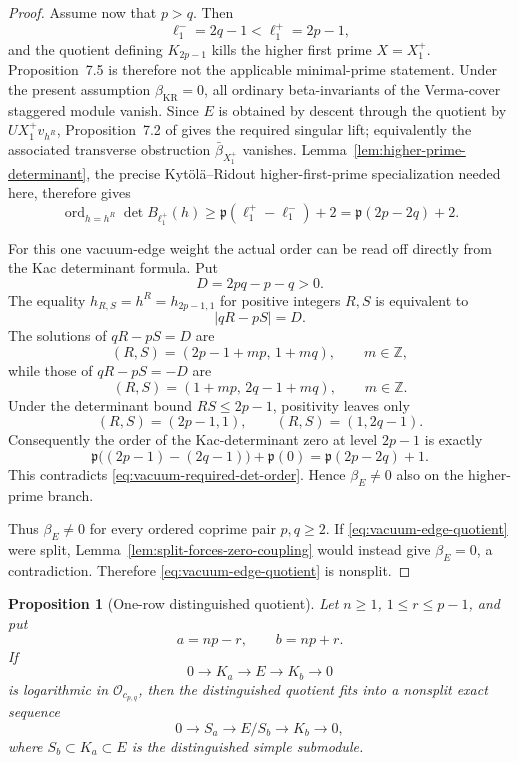 \documentclass[12pt,leqno]{amsart}
\numberwithin{equation}{section}
\newtheorem{prop}[thm]{Proposition}
\newcommand{\Oc}{\mathcal O}
\def\Z{\mathbb{Z}}
\begin{document}
\begin{proof}
Assume now that $p>q$.  Then
\[
 \ell^-_1=2q-1<\ell^+_1=2p-1,
\]
and the quotient defining $K_{2p-1}$ kills the higher first prime
$X=X^+_1$.  Proposition~7.5 is therefore not the applicable
minimal-prime statement.  Under the present assumption
$\beta_{\mathrm{KR}}=0$, all ordinary beta-invariants of the Verma-cover
staggered module vanish.  Since $E$ is obtained by descent through the
quotient by $UX^+_1v_{h^R}$, Proposition~7.2 of
\cite{KytolaRidout} gives the required singular lift; equivalently the
associated transverse obstruction $\bar\beta_{X^+_1}$ vanishes.
Lemma~\ref{lem:higher-prime-determinant}, the precise
Kyt\"ol\"a--Ridout higher-first-prime specialization needed here,
therefore gives
\begin{equation}\label{eq:vacuum-required-det-order}
 \operatorname{ord}_{h=h^R}\det B_{\ell^+_1}(h)
 \ge \mathfrak p(\ell^+_1-\ell^-_1)+2
 =\mathfrak p(2p-2q)+2.
\end{equation}

For this one vacuum-edge weight the actual order can be read off directly
from the Kac determinant formula.  Put
\[
 D=2pq-p-q>0.
\]
The equality $h_{R,S}=h^R=h_{2p-1,1}$ for positive integers $R,S$ is
equivalent to
\[
 |qR-pS|=D.
\]
The solutions of $qR-pS=D$ are
\[
 (R,S)=(2p-1+mp,\,1+mq),\qquad m\in\Z,
\]
while those of $qR-pS=-D$ are
\[
 (R,S)=(1+mp,\,2q-1+mq),\qquad m\in\Z.
\]
Under the determinant bound $RS\le2p-1$, positivity leaves only
\[
 (R,S)=(2p-1,1),\qquad (R,S)=(1,2q-1).
\]
Consequently the order of the Kac-determinant zero at level $2p-1$ is
exactly
\begin{equation}\label{eq:vacuum-actual-det-order}
 \mathfrak p\bigl((2p-1)-(2q-1)\bigr)+\mathfrak p(0)
 =\mathfrak p(2p-2q)+1.
\end{equation}
This contradicts \eqref{eq:vacuum-required-det-order}.  Hence
$\beta_E\ne0$ also on the higher-prime branch.

Thus $\beta_E\ne0$ for every ordered coprime pair $p,q\ge2$.  If
\eqref{eq:vacuum-edge-quotient} were split,
Lemma~\ref{lem:split-forces-zero-coupling} would instead give
$\beta_E=0$, a contradiction.  Therefore
\eqref{eq:vacuum-edge-quotient} is nonsplit.
\end{proof}

\begin{prop}[One-row distinguished quotient]
\label{prop:one-row-staggered-quotient}
Let $n\ge1$, $1\le r\le p-1$, and put
\[
 a=np-r,\qquad b=np+r.
\]
If
\[
 0\longrightarrow K_a\longrightarrow E\longrightarrow K_b
 \longrightarrow0
\]
is logarithmic in $\Oc_{c_{p,q}}$, then the distinguished quotient
fits into a nonsplit exact sequence
\begin{equation}\label{eq:one-row-distinguished-nonsplit}
 0\longrightarrow S_a\longrightarrow E/S_b\longrightarrow K_b
 \longrightarrow0,
\end{equation}
where $S_b\subset K_a\subset E$ is the distinguished simple submodule.
\end{prop}
\end{document}
